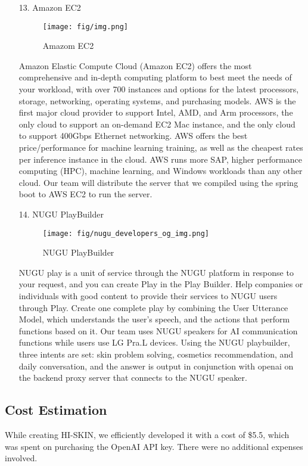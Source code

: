 \documentclass[conference]{IEEEtran}
\begin{document}
\begin{enumerate}
    \item[13.]Amazon EC2
    \begin{figure}[h]
    \centering
    \texttt{[image: fig/img.png]}
    \label{fig:Amazon EC2}
    \caption{Amazom EC2} 
    \end{figure}
    \item[]Amazon Elastic Compute Cloud (Amazon EC2) offers the most comprehensive and in-depth computing platform to best meet the needs of your workload, with over 700 instances and options for the latest processors, storage, networking, operating systems, and purchasing models. AWS is the first major cloud provider to support Intel, AMD, and Arm processors, the only cloud to support an on-demand EC2 Mac instance, and the only cloud to support 400Gbps Ethernet networking. AWS offers the best price/performance for machine learning training, as well as the cheapest rates per inference instance in the cloud. AWS runs more SAP, higher performance computing (HPC), machine learning, and Windows workloads than any other cloud. Our team will distribute the server that we compiled using the spring boot to AWS EC2 to run the server.\\

    \item[14.]NUGU PlayBuilder
    \begin{figure}[h]
    \centering
    \texttt{[image: fig/nugu\_developers\_og\_img.png]}
    \label{fig:NUGU PlayBuilder}
    \caption{NUGU PlayBuilder} 
    \end{figure}
    \item[]NUGU play is a unit of service through the NUGU platform in response to your request, and you can create Play in the Play Builder. Help companies or individuals with good content to provide their services to NUGU users through Play. Create one complete play by combining the User Utterance Model, which understands the user's speech, and the actions that perform functions based on it. Our team uses NUGU speakers for AI communication functions while users use LG Pra.L devices. Using the NUGU playbuilder, three intents are set: skin problem solving, cosmetics recommendation, and daily conversation, and the answer is output in conjunction with openai on the backend proxy server that connects to the NUGU speaker.

\end{enumerate}

\subsection{Cost Estimation}
While creating HI-SKIN, we efficiently developed it with a cost of \$5.5, which was spent on purchasing the OpenAI API key. There were no additional expenses involved.\\ 
\end{document}
